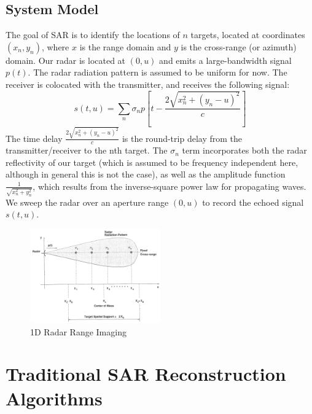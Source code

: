 \documentclass{article}
\begin{document}
\subsection{System Model}
\indent \indent
The goal of SAR is to identify the locations of \( n \) targets, located at coordinates \((x_{n} , y_{n}) \), where \( x \) is the range domain and \( y \) is the cross-range
    (or azimuth) domain. Our radar is located at \((0,u) \) and emits a large-bandwidth signal \( p(t) \). The radar radiation pattern is assumed to be uniform for now. The receiver is colocated with the transmitter, and receives the following signal:
\begin{displaymath}
    s(t,u) = \sum\limits_{n}^{} \sigma_{n} p \left[ t - \frac{2 \sqrt{x_{n}^2 +(y_{n} - u)^2}}{c}  \right]
\end{displaymath}
The time delay \( \frac{2 \sqrt{x_{n}^2 +(y_{n} - u)^2}}{c} \) is the round-trip delay from the transmitter/receiver to the nth target. The \( \sigma_{n} \) term incorporates both the radar reflectivity of our target (which is assumed to be frequency independent here, although in general this is not the case), as well as the amplitude function \( \frac{1}{\sqrt{x_{n}^2 + y_{n}^2}} \), which results from the inverse-square power law for propagating waves. We sweep the radar over an aperture range \((0,u) \) to record the echoed signal \( s(t,u) \).
\begin{figure} [h!]
    \centering
    \includegraphics[width=0.5\textwidth]{Figures/range_diagram.png}
    \caption{1D Radar Range Imaging}
    \label{range_diagram}
\end{figure}


\section{Traditional SAR Reconstruction Algorithms}
\end{document}
